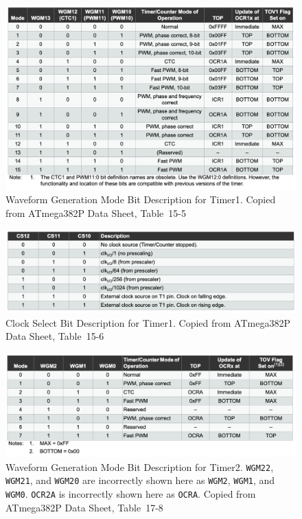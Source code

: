 \begin{figure}
    \centering
    \includegraphics[width=15cm]{WGM-Timer1}
    \caption{Waveform Generation Mode Bit Description for Timer1. \tiny Copied from ATmega382P Data Sheet, Table~15-5 \label{fig:Timer1WGM}}
\end{figure}

\begin{figure}
    \centering
    \includegraphics[width=15cm]{CS-Timer1}
    \caption{Clock Select Bit Description for Timer1. \tiny Copied from ATmega382P Data Sheet, Table~15-6 \label{fig:Timer1CS}}
\end{figure}

\begin{figure}
    \centering
    \includegraphics[width=15cm]{WGM-Timer2}
    \caption{Waveform Generation Mode Bit Description for Timer2. \texttt{WGM22}, \texttt{WGM21}, and \texttt{WGM20} are incorrectly shown here as \texttt{WGM2}, \texttt{WGM1}, and \texttt{WGM0}. \texttt{OCR2A} is incorrectly shown here as \texttt{OCRA}. \tiny Copied from ATmega382P Data Sheet, Table~17-8 \label{fig:Timer2WGM}}
\end{figure}

